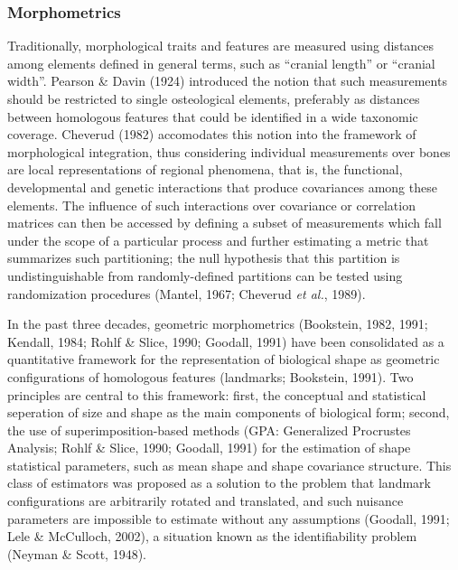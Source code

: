 \documentclass[11pt,twoside]{report}
\begin{document}
\subsubsection{Morphometrics}\label{morphometrics}

Traditionally, morphological traits and features are measured using
distances among elements defined in general terms, such as ``cranial
length'' or ``cranial width''. Pearson \& Davin (1924) introduced the
notion that such measurements should be restricted to single
osteological elements, preferably as distances between homologous
features that could be identified in a wide taxonomic coverage. Cheverud
(1982) accomodates this notion into the framework of morphological
integration, thus considering individual measurements over bones are
local representations of regional phenomena, that is, the functional,
developmental and genetic interactions that produce covariances among
these elements. The influence of such interactions over covariance or
correlation matrices can then be accessed by defining a subset of
measurements which fall under the scope of a particular process and
further estimating a metric that summarizes such partitioning; the null
hypothesis that this partition is undistinguishable from
randomly-defined partitions can be tested using randomization procedures
(Mantel, 1967; Cheverud \emph{et al.}, 1989).

In the past three decades, geometric morphometrics (Bookstein, 1982,
1991; Kendall, 1984; Rohlf \& Slice, 1990; Goodall, 1991) have been
consolidated as a quantitative framework for the representation of
biological shape as geometric configurations of homologous features
(landmarks; Bookstein, 1991). Two principles are central to this
framework: first, the conceptual and statistical seperation of size and
shape as the main components of biological form; second, the use of
superimposition-based methods (GPA: Generalized Procrustes Analysis;
Rohlf \& Slice, 1990; Goodall, 1991) for the estimation of shape
statistical parameters, such as mean shape and shape covariance
structure. This class of estimators was proposed as a solution to the
problem that landmark configurations are arbitrarily rotated and
translated, and such nuisance parameters are impossible to estimate
without any assumptions (Goodall, 1991; Lele \& McCulloch, 2002), a
situation known as the identifiability problem (Neyman \& Scott, 1948).
\end{document}
